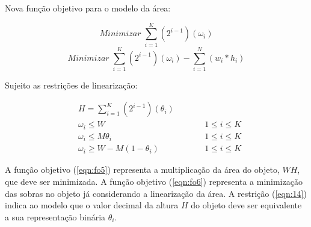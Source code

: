         Nova função objetivo para o modelo da área:
    
        \begin{equation}
            Minimizar \; \sum_{i=1}^K (2^{i-1}) (\omega_{i})    \label{eqn:fo5}
        \end{equation}
        \begin{equation}
            Minimizar \; \sum_{i=1}^K (2^{i-1}) (\omega_{i}) - \sum_{i=1}^N (w_{i} * h_{i})    \label{eqn:fo6}
        \end{equation}

        Sujeito as restrições de linearização:

        \begin{small}
            \begin{align}
                \label{eqn:14}
                & {H} = \sum_{i=1}^K (2^{i-1}) (\theta_{i}) \\
                \label{eqn:15}
                & {\omega}_{i} \leq {W}                         && \qquad 1 \leq i \leq K  \\
                \label{eqn:16}
                & {\omega}_{i} \leq {M} {\theta}_{i}            && \qquad 1 \leq i \leq K  \\
                \label{eqn:17}
                & {\omega}_{i} \geq {W} - M (1 - {\theta}_{i})  && \qquad 1 \leq i \leq K
            \end{align}
        \end{small}

        A função objetivo (\ref{eqn:fo5}) representa a multiplicação da área do objeto, $W H$, que deve ser minimizada. A função objetivo (\ref{eqn:fo6}) representa a minimização das sobras no objeto já considerando a linearização da área. A restrição (\ref{eqn:14}) indica ao modelo que o valor decimal da altura $H$ do objeto deve ser equivalente a sua representação binária $\theta_i$.